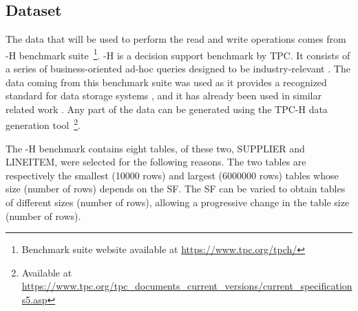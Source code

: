 \subsection{Dataset}
\label{subsec:dataset}

The data that will be used to perform the read and write operations comes from -H benchmark suite~\footnote{Benchmark suite website available at \url{https://www.tpc.org/tpch/}}. -H is a decision support benchmark by \gls{TPC}. It consists of a series of business-oriented ad-hoc queries designed to be industry-relevant \cite{transactionprocessingperformancecounciltpcTPCH_v301pdf1993}. The data coming from this benchmark suite was used as
it provides a recognized standard for data storage systems \cite{TPC_benchmarks_2000}, and it has already been used in similar related work \cite{raasveldtDuckDBEmbeddableAnalytical2019, behmPhotonFastQuery2022}. Any part of the data can be generated using the TPC-H data generation tool~\footnote{Available at \url{https://www.tpc.org/tpc_documents_current_versions/current_specifications5.asp}}.

The -H benchmark contains eight tables, of these two, SUPPLIER and LINEITEM, were selected for the following reasons. The two tables are respectively the smallest (10000 rows) and largest (6000000 rows) tables whose size (number of rows) depends on the \gls{SF}. The \gls{SF} can be varied to obtain tables of different sizes (number of rows), allowing a progressive change in the table size (number of rows). 

